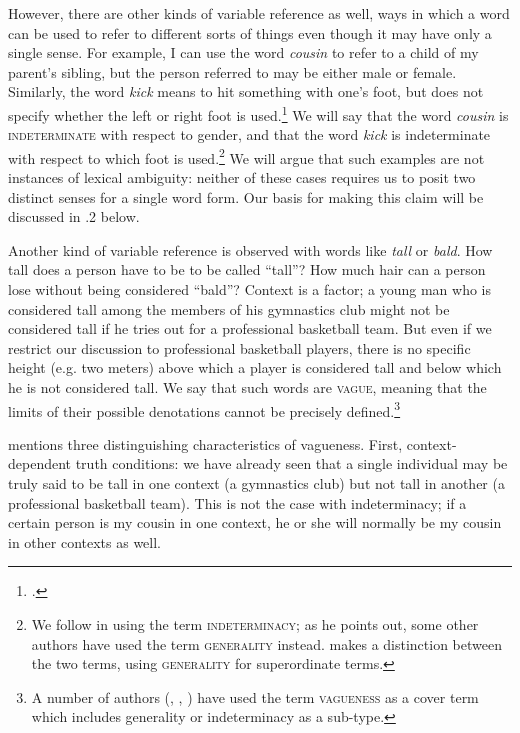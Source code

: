 However, there are other kinds of variable reference as well, ways in which a word can be used to refer to different sorts of things even though it may have only a single sense. For example, I can use the word \textit{cousin} to refer to a child of my parent’s sibling, but the person referred to may be either male or female. Similarly, the word \textit{kick} means to hit something with one’s foot, but does not specify whether the left or right foot is used.\footnote{\citet{Lakoff1970}.} We will say that the word \textit{cousin} is \textsc{indeterminate} with respect to gender, and that the word \textit{kick} is indeterminate with respect to which foot is used.\footnote{We follow \citet{Kennedy2011} in using the term \textsc{indeterminacy}; as he points out, some other authors have used the term \textsc{generality} instead. \citet{Gillon1990} makes a distinction between the two terms, using \textsc{generality} for superordinate terms.} We will argue that such examples are not instances of lexical ambiguity: neither of these cases requires us to posit two distinct senses for a single word form. Our basis for making this claim will be discussed in .2 below.



Another kind of variable reference is observed with words like \textit{tall} or \textit{bald}. How tall does a person have to be to be called “tall”? How much hair can a person lose without being considered “bald”? Context is a factor; a young man who is considered tall among the members of his gymnastics club might not be considered tall if he tries out for a professional basketball team. But even if we restrict our discussion to professional basketball players, there is no specific height (e.g. two meters) above which a player is considered tall and below which he is not considered tall. We say that such words are \textsc{vague}, meaning that the limits of their possible denotations cannot be precisely defined.\footnote{A number of authors (\citealt{Kempson1977}, \citealt{Lakoff1970}, \citealt{Tuggy1993}) have used the term \textsc{vagueness} as a cover term which includes generality or indeterminacy as a sub-type.}



\citet{Kennedy2011} mentions three distinguishing characteristics of vagueness. First, context-dependent truth conditions: we have already seen that a single individual may be truly said to be tall in one context (a gymnastics club) but not tall in another (a professional basketball team). This is not the case with indeterminacy; if a certain person is my cousin in one context, he or she will normally be my cousin in other contexts as well.



